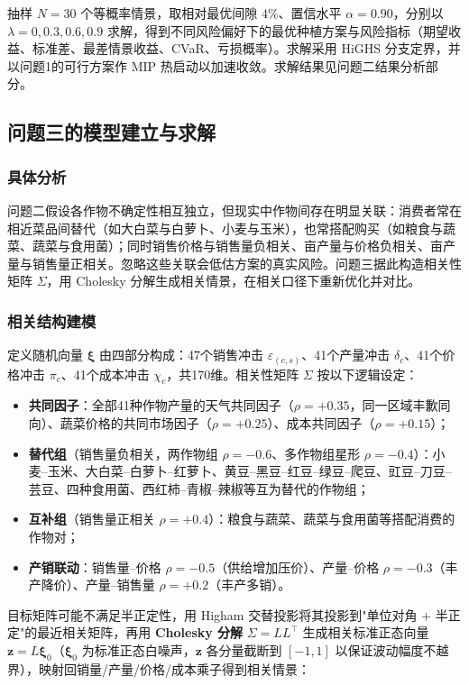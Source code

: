 抽样 $N=30$ 个等概率情景，取相对最优间隙 $4\%$、置信水平 $\alpha=0.90$，分别以 $\lambda=0,0.3,0.6,0.9$ 求解，得到不同风险偏好下的最优种植方案与风险指标（期望收益、标准差、最差情景收益、CVaR、亏损概率）。求解采用 HiGHS 分支定界，并以问题1的可行方案作 MIP 热启动以加速收敛。求解结果见问题二结果分析部分。

\subsection{问题三的模型建立与求解}
\subsubsection{具体分析}

问题二假设各作物不确定性相互独立，但现实中作物间存在明显关联：消费者常在相近菜品间替代（如大白菜与白萝卜、小麦与玉米），也常搭配购买（如粮食与蔬菜、蔬菜与食用菌）；同时销售价格与销售量负相关、亩产量与价格负相关、亩产量与销售量正相关。忽略这些关联会低估方案的真实风险。问题三据此构造相关性矩阵 $\Sigma$，用 Cholesky 分解生成相关情景，在相关口径下重新优化并对比。

\subsubsection{相关结构建模}

定义随机向量 $\boldsymbol{\xi}$ 由四部分构成：47个销售冲击 $\varepsilon_{(c,s)}$、41个产量冲击 $\delta_c$、41个价格冲击 $\pi_c$、41个成本冲击 $\chi_c$，共170维。相关性矩阵 $\Sigma$ 按以下逻辑设定：

\begin{itemize}
	\item \textbf{共同因子}：全部41种作物产量的天气共同因子（$\rho=+0.35$，同一区域丰歉同向）、蔬菜价格的共同市场因子（$\rho=+0.25$）、成本共同因子（$\rho=+0.15$）；
	\item \textbf{替代组}（销售量负相关，两作物组 $\rho=-0.6$、多作物组星形 $\rho=-0.4$）：小麦--玉米、大白菜--白萝卜--红萝卜、黄豆--黑豆--红豆--绿豆--爬豆、豇豆--刀豆--芸豆、四种食用菌、西红柿--青椒--辣椒等互为替代的作物组；
	\item \textbf{互补组}（销售量正相关 $\rho=+0.4$）：粮食与蔬菜、蔬菜与食用菌等搭配消费的作物对；
	\item \textbf{产销联动}：销售量--价格 $\rho=-0.5$（供给增加压价）、产量--价格 $\rho=-0.3$（丰产降价）、产量--销售量 $\rho=+0.2$（丰产多销）。
\end{itemize}

目标矩阵可能不满足半正定性，用 Higham 交替投影\cite{higham2002}将其投影到"单位对角 $+$ 半正定"的最近相关矩阵，再用 \textbf{Cholesky 分解} $\Sigma = LL^{\top}$ 生成相关标准正态向量 $\mathbf{z}=L\boldsymbol{\xi}_0$（$\boldsymbol{\xi}_0$ 为标准正态白噪声，$\mathbf{z}$ 各分量截断到 $[-1,1]$ 以保证波动幅度不越界），映射回销量/产量/价格/成本乘子得到相关情景：

